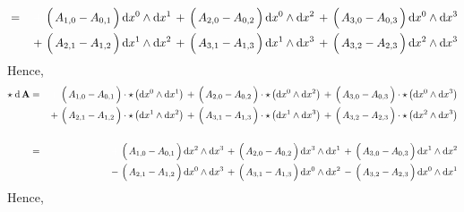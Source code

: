 \begin{enumerate}
\begin{eqnarray*}
	\\ \\
	& = &
		\,{\color{white}+}\,
		\left(\,A_{1,0} \overset{{\color{white}.}}{-} A_{0,1}\,\right)
		\d x^{0} \wedge \d x^{1}
		\,+\,
		\left(\,A_{2,0} \overset{{\color{white}.}}{-} A_{0,2}\,\right)
		\d x^{0} \wedge \d x^{2}
		\,+\,
		\left(\,A_{3,0} \overset{{\color{white}.}}{-} A_{0,3}\,\right)
		\d x^{0} \wedge \d x^{3}
	\\
	&&
		\,+\,
		\left(\,A_{2,1} \overset{{\color{white}.}}{-} A_{1,2}\,\right)
		\d x^{1} \wedge \d x^{2}
		\,+\,
		\left(\,A_{3,1} \overset{{\color{white}.}}{-} A_{1,3}\,\right)
		\d x^{1} \wedge \d x^{3}
		\,+\,
		\left(\,A_{3,2} \overset{{\color{white}.}}{-} A_{2,3}\,\right)
		\d x^{2} \wedge \d x^{3}
	\end{eqnarray*}
	Hence,
	\begin{eqnarray*}
	\star\;\d\,\mathbf{A}
	& = &
		\,{\color{white}+}\,
		\left(\,A_{1,0} \overset{{\color{white}.}}{-} A_{0,1}\,\right)
		\cdot
		\star\left(\d x^{0} \wedge \d x^{1}\right)
		\,+\,
		\left(\,A_{2,0} \overset{{\color{white}.}}{-} A_{0,2}\,\right)
		\cdot
		\star\left(\d x^{0} \wedge \d x^{2}\right)
		\,+\,
		\left(\,A_{3,0} \overset{{\color{white}.}}{-} A_{0,3}\,\right)
		\cdot
		\star\left(\d x^{0} \wedge \d x^{3}\right)
	\\
	&&
		\,+\,
		\left(\,A_{2,1} \overset{{\color{white}.}}{-} A_{1,2}\,\right)
		\cdot
		\star\left(\d x^{1} \wedge \d x^{2}\right)
		\,+\,
		\left(\,A_{3,1} \overset{{\color{white}.}}{-} A_{1,3}\,\right)
		\cdot
		\star\left(\d x^{1} \wedge \d x^{3}\right)
		\,+\,
		\left(\,A_{3,2} \overset{{\color{white}.}}{-} A_{2,3}\,\right)
		\cdot
		\star\left(\d x^{2} \wedge \d x^{3}\right)
	\\ \\
	& = &
		\,{\color{white}+}\,
		\left(\,A_{1,0} \overset{{\color{white}.}}{-} A_{0,1}\,\right)
		\d x^{2} \wedge \d x^{3}
		\,+\,
		\left(\,A_{2,0} \overset{{\color{white}.}}{-} A_{0,2}\,\right)
		\d x^{3} \wedge \d x^{1}
		\,+\,
		\left(\,A_{3,0} \overset{{\color{white}.}}{-} A_{0,3}\,\right)
		\d x^{1} \wedge \d x^{2}
	\\
	&&
		\,-\,
		\left(\,A_{2,1} \overset{{\color{white}.}}{-} A_{1,2}\,\right)
		\d x^{0} \wedge \d x^{3}
		\,+\,
		\left(\,A_{3,1} \overset{{\color{white}.}}{-} A_{1,3}\,\right)
		\d x^{0} \wedge \d x^{2}
		\,-\,
		\left(\,A_{3,2} \overset{{\color{white}.}}{-} A_{2,3}\,\right)
		\d x^{0} \wedge \d x^{1}
	\end{eqnarray*}
	Hence,
	\begin{eqnarray*}

\end{eqnarray*}
\end{enumerate}
